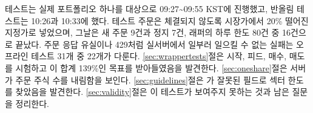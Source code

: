 \seclabel
{}

 테스트는 실제 포트폴리오 하나를 대상으로 09:27\textasciitilde 09:55 KST에 진행했고, 반올림 테스트는 10:26과 10:33에 했다. 테스트 주문은 체결되지 않도록 시장가에서 20\% 떨어진 지정가로 넣었으며, 그날은 새 주문 9건과 정지 7건, 래퍼의 하루 한도 80건 중 16건으로 끝났다. 주문 응답 유실이나 429처럼 실서버에서 일부러 일으킬 수 없는 실패는 오프라인 테스트 31개 중 22개가 다룬다. \ref{sec:wrappertests}절은 시작, 피드, 매수, 매도를 시험하고 이 합계 139\%인 목표를 받아들였음을 발견한다. \ref{sec:oneshare}절은 서버가 주문 주식 수를 내림함을 보인다. \ref{sec:guidelines}절은 가 잘못된 필드로 섹터 한도를 찾았음을 발견한다. \ref{sec:validity}절은 이 테스트가 보여주지 못하는 것과 남은 질문을 정리한다.
